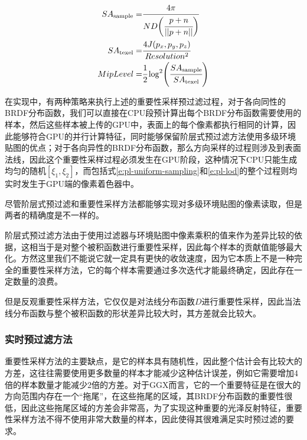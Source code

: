 \begin{equation}\label{e:pl-lod}
\begin{aligned}
	SA_{\rm sample}=&\cfrac{4\pi}{ND\bigg(\cfrac{p+n}{||p+n||}\bigg)}\\
	SA_{\rm texel}=&\cfrac{4J(p_x,p_y,p_z)}{Resolution^{2}}\\
	MipLevel=&\cfrac{1}{2}\log^2\Biggl(\cfrac{SA_{\rm sample}}{SA_{\rm texel}}\Biggl)
\end{aligned}
\end{equation}

在实现中，有两种策略来执行上述的重要性采样预过滤过程，对于各向同性的BRDF分布函数，我们可以直接在CPU段预计算出每个BRDF分布函数需要使用的样本，然后这些样本被上传的GPU中，表面上的每个像素都执行相同的计算，因此能够符合GPU的并行计算特征，同时能够保留阶层式预过滤方法使用多级环境贴图的优点；对于各向异性的BRDF分布函数，那么方向采样的过程则涉及到表面法线，因此这个重要性采样过程必须发生在GPU阶段，这种情况下CPU只能生成均匀的随机$[\xi_1,\xi_2]$，而包括式\ref{e:pl-uniform-sampling}和\ref{e:pl-lod}的整个过程则均实时发生于GPU端的像素着色器中。

\begin{myshaded}
	尽管阶层式预过滤和重要性采样方法都能够实现对多级环境贴图的像素读取，但是两者的精确度是不一样的。
	
	阶层式预过滤方法由于使用过滤器与环境贴图中像素乘积的值来作为差异比较的依据，这相当于是对整个被积函数进行重要性采样，因此每个样本的贡献值能够最大化。方然这里我们不能说它就一定具有更快的收敛速度，因为它本质上不是一种完全的重要性采样方法，它的每个样本需要通过多次迭代才能最终确定，因此存在一定数量的浪费。
	
	但是反观重要性采样方法，它仅仅是对法线分布函数$D$进行重要性采样，因此当法线分布函数与整个被积函数的形状差异比较大时，其方差就会比较大。
\end{myshaded}




\subsubsection{实时预过滤方法}
重要性采样方法的主要缺点，是它的样本具有随机性，因此整个估计会有比较大的方差，这往往需要使用更多数量的样本才能减少这种估计误差，例如它需要增加4倍的样本数量才能减少2倍的方差。对于GGX而言，它的一个重要特征是在很大的方向范围内存在一个“拖尾”，在这些拖尾的区域，其BRDF分布函数的重要性很低，因此这些拖尾区域的方差会非常高，为了实现这种重要的光泽反射特征，重要性采样方法不得不使用非常大数量的样本，因此使得其很难满足实时预过滤的要求。

